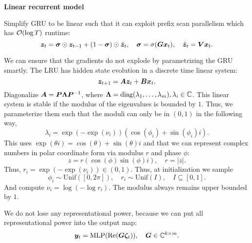 \documentclass[10pt]{article}
\newenvironment{topic}[1]
{\textbf{\sffamily \colorbox{black}{\rlap{\textbf{\textcolor{white}{#1}}}\hspace{\linewidth}\hspace{-2\fboxsep}}}}
{}
\newenvironment{subtopic}[1]
{\begin{center}\textbf{\sffamily #1}\end{center}}
{}
\begin{document}
\begin{multicols*}{3}
\begin{topic}{Recurrent neural networks}
        \begin{subtopic}{Linear recurrent model}
            Simplify GRU to be linear such that it can exploit prefix scan parallelism which has $\bigo{\log T}$ runtime: \[
                \bm{z}_t = \bm{\sigma} \odot \bm{z}_{t-1} + (1-\bm{\sigma}) \odot \tilde{\bm{z}}_t, \quad \bm{\sigma} = \sigma(\bm{G}\bm{x}_t), \quad \tilde{\bm{z}}_t = \bm{V}\bm{x}_t.
            \]

            We can ensure that the gradients do not explode by parametrizing the GRU smartly. The LRU has hidden state evolution in a discrete time linear system: \[
                \bm{z}_{t+1} = \bm{A} \bm{z}_t + \bm{B} \bm{x}_t.
            \]
            Diagonalize $\bm{A} = \bm{P}\bm{\Lambda}\bm{P}^{-1}$, where $\bm{\Lambda} =
            \mathrm{diag}(\lambda_1, \ldots, \lambda_m), \lambda_i \in \mathbb{C}$. This linear
            system is stable if the modulus of the eigenvalues is bounded by $1$. Thus, we
            parameterize them such that the moduli can only be in $(0,1)$ in the following way, \[
                \lambda_i = \exp(-\exp(\nu_i))(\cos(\phi_i) + \sin(\phi_i)i).
            \]
            This uses $\exp(\theta i) = \cos(\theta) + \sin(\theta)i$ and that we can represent complex numbers in polar coordinate form via modulus $r$ and phase $\phi$: \[
                z = r(\cos(\phi) \sin(\phi) i), \quad r = |z|.
            \]
            Thus, $r_i = \exp(-\exp(\nu_i)) \in (0,1)$. Thus, at initialization we sample \[
                \phi_i \sim \mathrm{Unif}([0,2\pi]), \quad r_i \sim \mathrm{Unif}(I), \quad I \subseteq [0,1].
            \]
            And compute $\nu_i = \log(-\log r_i)$. The modulus always remains upper bounded by $1$.

            We do not lose any representational power, because we can put all representational power into the output map: \[
                \bm{y}_t = \mathrm{MLP}(\mathrm{Re}(\bm{G}\bm{\zeta}_t)), \quad \bm{G} \in \mathbb{C}^{k \times m}.
            \]
        \end{subtopic}


\end{topic}
\end{multicols*}
\end{document}
